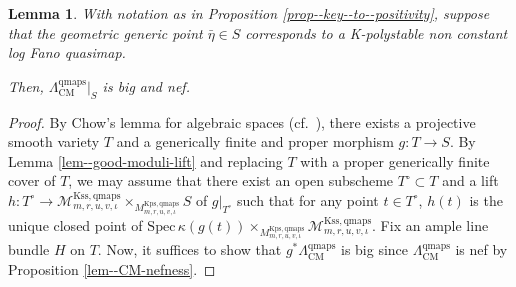 \documentclass[12pt,twoside]{amsart}
\newtheorem{lem}[thm]{Lemma}
\theoremstyle{definition}
\begin{document}
\begin{lem}\label{lem--bigness-for-nonconstant-maps}
    With notation as in Proposition \ref{prop--key--to--positivity}, suppose that the geometric generic point $\bar{\eta}\in S$ corresponds to a K-polystable non constant log Fano quasimap.

    Then, $\Lambda^{\mathrm{qmaps}}_{\mathrm{CM}}|_S$ is big and nef.
\end{lem}

\begin{proof}
    By Chow's lemma for algebraic spaces (cf.~\cite[Theorem 7.4.1]{Ols}), there exists a projective smooth variety $T$ and a generically finite and proper morphism $g\colon T\to S$.
    By Lemma \ref{lem--good-moduli-lift} and replacing $T$ with a proper generically finite cover of $T$, we may assume that there exist an open subscheme $T^\circ\subset T$ and a lift $h\colon T^\circ\to\mathcal{M}^{\mathrm{Kss,qmaps}}_{m,r,u,v,\iota}\times_{M^{\mathrm{Kps,qmaps}}_{m,r,u,v,\iota}}S$ of $g|_{T^\circ}$ such that for any point $t\in T^\circ$, $h(t)$ is the unique closed point of $\mathrm{Spec}\,\kappa(g(t))\times_{M^{\mathrm{Kps,qmaps}}_{m,r,u,v,\iota}} \mathcal{M}^{\mathrm{Kss,qmaps}}_{m,r,u,v,\iota}$.
    Fix an ample line bundle $H$ on $T$.
    Now, it suffices to show that $g^*\Lambda^{\mathrm{qmaps}}_{\mathrm{CM}}$ is big since $\Lambda^{\mathrm{qmaps}}_{\mathrm{CM}}$ is nef by Proposition \ref{lem--CM-nefness}.


\end{proof}
\end{document}
